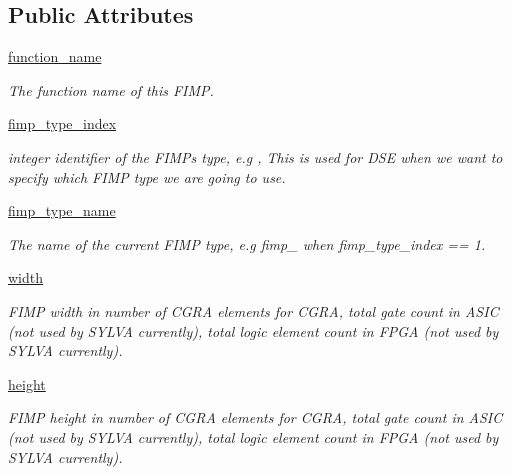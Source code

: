 \subsection*{Public Attributes}
\begin{DoxyCompactItemize}
\item 
\hyperlink{classsylva_1_1base_1_1fimp_1_1_f_i_m_p_cost_afb919056ee51978896f0132907a50933}{function\+\_\+name}
\begin{DoxyCompactList}\small\item\em The function name of this F\+I\+MP. \end{DoxyCompactList}\item 
\hyperlink{classsylva_1_1base_1_1fimp_1_1_f_i_m_p_cost_a6b12a5e2573490c298eb49479e5c5db3}{fimp\+\_\+type\+\_\+index}
\begin{DoxyCompactList}\small\item\em integer identifier of the F\+I\+MP\textquotesingle{}s type, e.\+g {}, This is used for D\+SE when we want to specify which F\+I\+MP type we are going to use. \end{DoxyCompactList}\item 
\hyperlink{classsylva_1_1base_1_1fimp_1_1_f_i_m_p_cost_a0e3a5e51b56d03f44bf36db9280ca535}{fimp\+\_\+type\+\_\+name}
\begin{DoxyCompactList}\small\item\em The name of the current F\+I\+MP type, e.\+g {\ttfamily fimp\+\_} when {\ttfamily fimp\+\_\+type\+\_\+index == 1}. \end{DoxyCompactList}\item 
\hyperlink{classsylva_1_1base_1_1fimp_1_1_f_i_m_p_cost_a40224d915dcc08c4d54e9ac3006047b1}{width}
\begin{DoxyCompactList}\small\item\em F\+I\+MP width in number of C\+G\+RA elements for C\+G\+RA, total gate count in A\+S\+IC (not used by S\+Y\+L\+VA currently), total logic element count in F\+P\+GA (not used by S\+Y\+L\+VA currently). \end{DoxyCompactList}\item 
\hyperlink{classsylva_1_1base_1_1fimp_1_1_f_i_m_p_cost_a0e40cec2324c7d0eb82f511a0925c839}{height}
\begin{DoxyCompactList}\small\item\em F\+I\+MP height in number of C\+G\+RA elements for C\+G\+RA, total gate count in A\+S\+IC (not used by S\+Y\+L\+VA currently), total logic element count in F\+P\+GA (not used by S\+Y\+L\+VA currently). \end{DoxyCompactList}\item 

\end{DoxyCompactItemize}
